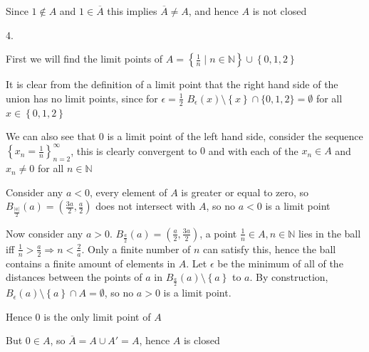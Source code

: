 \documentclass{article}
\begin{document}
\begin{problem}
\begin{solution}
	Since \( 1 \notin A \) and \( 1 \in \overline{A} \) this implies \( \overline{A} \neq A \), and hence \( A \) is not closed

\end{solution}

\begin{solution} 4.

	First we will find the limit points of \( A = \left\{ \frac{1}{n} \mid n \in \mathbb{N} \right\} \cup \left\{ 0,1,2 \right\}  \)

	It is clear from the definition of a limit point that the right hand side of the union has no limit points, since for \( \epsilon = \frac{1}{2} \) \( B_{\epsilon}(x)\setminus \left\{ x \right\}  \cap \{0,1,2\} = \emptyset \) for all \( x \in \left\{ 0,1,2 \right\}  \)

	We can also see that \( 0 \) is a limit point of the left hand side, consider the sequence \( \left\{ x_n = \frac{1}{n} \right\}_{n=2}^{\infty}  \), this is clearly convergent to \( 0 \) and with each of the \( x_n \in A \) and \( x_n \neq 0 \) for all \( n \in \mathbb{N} \)

	Consider any \( a < 0 \), every element of \( A \) is greater or equal to zero, so \( B_{\frac{|a|}{2}}(a) = \left( \frac{3a}{2}, \frac{a}{2} \right)  \) does not intersect with \( A \), so no \( a < 0 \) is a limit point

	Now consider any \( a > 0 \). \( B_{\frac{a}{2}}(a) = \left( \frac{a}{2}, \frac{3a}{2} \right)  \), a point \( \frac{1}{n} \in A, n \in \mathbb{N} \) lies in the ball iff \( \frac{1}{n} > \frac{a}{2} \Rightarrow n < \frac{2}{a} \). Only a finite number of \( n \) can satisfy this, hence the ball contains a finite amount of elements in \( A \). Let \( \epsilon \) be the minimum of all of the distances between the points of \( a \) in \( B_{\frac{a}{2}}(a) \setminus \left\{ a \right\}  \) to \( a \). By construction, \( B_{\epsilon}(a) \setminus \left\{ a \right\}  \cap A = \emptyset \), so no \( a > 0 \) is a limit point.

	Hence \( 0 \) is the only limit point of \( A \)

	But \( 0 \in A \), so \( \overline{A} = A \cup A' = A  \), hence \( A \) is closed


\end{solution}
\end{problem}
\end{document}
